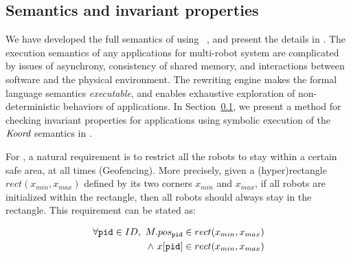 
\subsection{Semantics and invariant properties}

We have developed the full semantics of \lgname using \K~\cite{rosu-serbanuta-2013-k}, and present the details in . The execution semantics of any applications for multi-robot system are complicated by issues of asynchrony, consistency of shared memory, and interactions between software and  the physical environment.
The \K rewriting engine makes the formal language semantics \emph{executable}, and enables exhaustive exploration of non-deterministic behaviors of \lgname applications.
In Section~\ref{}, we present a method for checking invariant properties for \lgname applications using symbolic execution of the $\emph{Koord}$ semantics in \K.

For \LineForm, a natural requirement is to restrict all the robots to stay within a certain safe area, at all times (Geofencing).
More precisely, given a (hyper)rectangle $\mathit{rect}(x_{min}, x_{max})$ defined by its two corners $x_{min}$ and $x_{max}$,
if all robots are initialized within the rectangle, then all robots should always stay in the rectangle. This requirement can be stated as:
\begin{invariant}
\label{inv:lineform}
%
\[
\begin{split}
    \forall \texttt{pid} \in ID,\ M.pos_{\texttt{pid}} \in rect(x_{min}, x_{max}) \\
    \land\ x[\texttt{pid}] \in rect(x_{min}, x_{max})
\end{split}
\]
\end{invariant}


